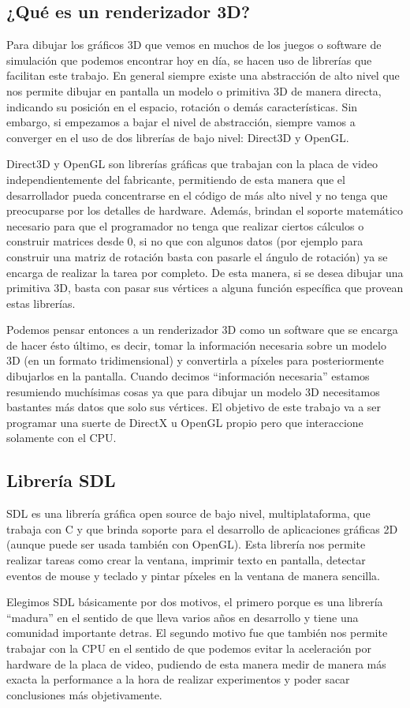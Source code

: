 \documentclass[a4paper]{article}
\begin{document}
\subsection{¿Qué es un renderizador 3D?}
Para dibujar los gráficos 3D que vemos en muchos de los juegos o software de simulación que podemos encontrar hoy en día, se hacen uso de librerías que facilitan este trabajo. En general siempre existe una abstracción de alto nivel que nos permite dibujar en pantalla un modelo o primitiva 3D de manera directa, indicando su posición en el espacio, rotación o demás características. Sin embargo, si empezamos a bajar el nivel de abstracción, siempre vamos a converger en el uso de dos librerías de bajo nivel: Direct3D y OpenGL.
\par Direct3D y OpenGL son librerías gráficas que trabajan con la placa de video independientemente del fabricante, permitiendo de esta manera que el desarrollador pueda concentrarse en el código de más alto nivel y no tenga que preocuparse por los detalles de hardware. Además, brindan el soporte matemático necesario para que el programador no tenga que realizar ciertos cálculos o construir matrices desde 0, si no que con algunos datos (por ejemplo para construir una matriz de rotación basta con pasarle el ángulo de rotación) ya se encarga de realizar la tarea por completo. De esta manera, si se desea dibujar una primitiva 3D, basta con pasar sus vértices a alguna función específica que provean estas librerías.
\par Podemos pensar entonces a un renderizador 3D como un software que se encarga de hacer ésto último, es decir, tomar la información necesaria sobre un modelo 3D (en un formato tridimensional) y convertirla a píxeles para posteriormente dibujarlos en la pantalla. Cuando decimos ``información necesaria'' estamos resumiendo muchísimas cosas ya que para dibujar un modelo 3D necesitamos bastantes más datos que solo sus vértices. El objetivo de este trabajo va a ser programar una suerte de DirectX u OpenGL propio pero que interaccione solamente con el CPU.

\subsection{Librería SDL}
SDL es una librería gráfica open source de bajo nivel, multiplataforma, que trabaja con C y que brinda soporte para el desarrollo de aplicaciones gráficas 2D (aunque puede ser usada también con OpenGL). Esta librería nos permite realizar tareas como crear la ventana, imprimir texto en pantalla, detectar eventos de mouse y teclado y pintar píxeles en la ventana de manera sencilla.
\par Elegimos SDL básicamente por dos motivos, el primero porque es una librería ``madura'' en el sentido de que lleva varios años en desarrollo y tiene una comunidad importante detras. El segundo motivo fue que también nos permite trabajar con la CPU en el sentido de que podemos evitar la aceleración por hardware de la placa de video, pudiendo de esta manera medir de manera más exacta la performance a la hora de realizar experimentos y poder sacar conclusiones más objetivamente. 
\end{document}
